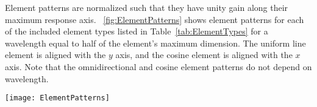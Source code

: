 Element patterns are normalized such that they have unity gain along their maximum response axis. \figurename~\ref{fig:ElementPatterns} shows element patterns for each of the included element types listed in Table~\ref{tab:ElementTypes} for a wavelength equal to half of the element's maximum dimension. The uniform line element is aligned with the $y$ axis, and the cosine element is aligned with the $x$ axis. Note that the omnidirectional and cosine element patterns do not depend on wavelength.

\begin{sidewaysfigure}[!ht]
\begin{center}
\texttt{[image: ElementPatterns]}
\caption{\label{fig:ElementPatterns}Element patterns for included element types}
\end{center}
\end{sidewaysfigure}

